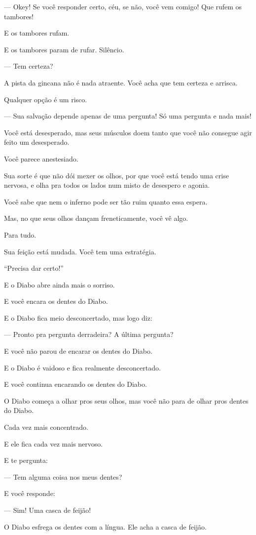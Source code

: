 --- Okey! Se você responder certo, céu, se não, você vem comigo! Que rufem os tambores!

E os tambores rufam.

E os tambores param de rufar. Silêncio.

--- Tem certeza?

A pista da gincana não é nada atraente. Você acha que tem certeza e arrisca.

Qualquer opção é um risco.

--- Sua salvação depende apenas de uma pergunta! Só uma pergunta e nada mais!

Você está desesperado, mas seus músculos doem tanto que você não consegue agir feito um desesperado.

Você parece anestesiado.

Sua sorte é que não dói mexer os olhos, por que você está tendo uma crise nervosa, e olha pra todos os lados num misto de desespero e agonia.

Você sabe que nem o inferno pode ser tão ruim quanto essa espera.

Mas, no que seus olhos dançam freneticamente, você vê algo.

Para tudo.

Sua feição está mudada. Você tem uma estratégia.

``Precisa dar certo!''

E o Diabo abre ainda mais o sorriso.

E você encara os dentes do Diabo.

E o Diabo fica meio desconcertado, mas logo diz:

--- Pronto pra pergunta derradeira? A última pergunta?

E você não parou de encarar os dentes do Diabo.

E o Diabo é vaidoso e fica realmente desconcertado.

E você continua encarando os dentes do Diabo.

O Diabo começa a olhar pros seus olhos, mas você não para de olhar pros dentes do Diabo.

Cada vez mais concentrado.

E ele fica cada vez mais nervoso.

E te pergunta:

--- Tem alguma coisa nos meus dentes?

E você responde:

--- Sim! Uma casca de feijão!

O Diabo esfrega os dentes com a língua. Ele acha a casca de feijão.

